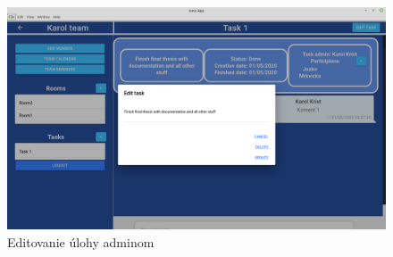 \begin{figure}[H]
    \centering
    \includegraphics[scale=0.30]{img/design/edit_task.png}
    \caption{Editovanie úlohy adminom}
    \label{fig:task_edit}
\end{figure}